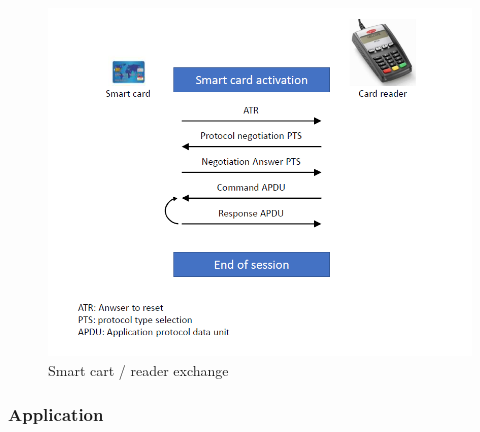 \documentclass{article}
\begin{document}
                        \begin{figure}[h]
                            \begin{center}
                                \includegraphics[scale=0.7]{../immagini/smart_card_funciton.png}
                            \end{center}
                            \caption{Smart cart /
                            reader
                            exchange}
                        \end{figure}

                        \subsubsection{Application}
\end{document}
